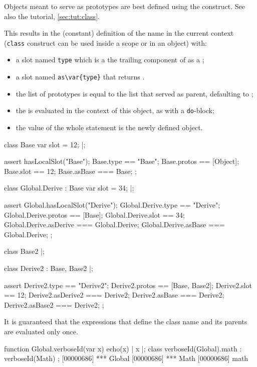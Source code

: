 Objects meant to serve as prototypes are best defined using the
 construct.  See also the tutorial, \autoref{sec:tut:class}.


This results in the (constant) definition of the name  in the
current context (\lstinline{class} construct can be used inside a scope or
in an object) with:
\begin{itemize}
\item a slot named \lstinline{type} which is a the trailing component of
   as a ;
\item a slot named \lstinline|as\var{type}| that returns \this.
\item the list of prototypes is equal to the list  that
  served as parent, defaulting to ;
\item the  is evaluated in the context of this object, as with a
  \lstinline{do}-block;
\item the value of the whole statement is the newly defined object.
\end{itemize}

\begin{urbiscript}
class Base
{
  var slot = 12;
}|;

assert
{
  hasLocalSlot("Base");
  Base.type   == "Base";
  Base.protos == [Object];
  Base.slot   == 12;
  Base.asBase === Base;
};

class Global.Derive : Base
{
  var slot = 34;
}|;

assert
{
  Global.hasLocalSlot("Derive");
  Global.Derive.type     == "Derive";
  Global.Derive.protos   == [Base];
  Global.Derive.slot     == 34;
  Global.Derive.asDerive === Global.Derive;
  Global.Derive.asBase   === Global.Derive;
};

class Base2 {}|;

class Derive2 : Base, Base2 {}|;

assert
{
  Derive2.type      == "Derive2";
  Derive2.protos    == [Base, Base2];
  Derive2.slot      == 12;
  Derive2.asDerive2 === Derive2;
  Derive2.asBase    === Derive2;
  Derive2.asBase2   === Derive2;
};
\end{urbiscript}

It is guaranteed that the expressions that define the class name and its
parents are evaluated only once.

\begin{urbiscript}
function Global.verboseId(var x)
{
  echo(x) | x
}|;
class verboseId(Global).math : verboseId(Math)
{
};
[00000686] *** Global
[00000686] *** Math
[00000686] math
\end{urbiscript}



